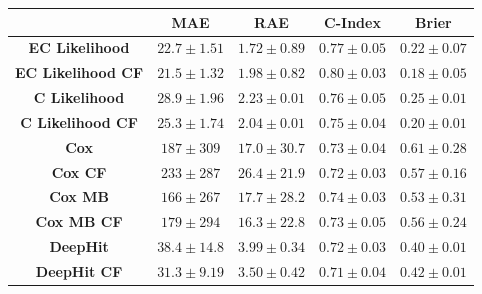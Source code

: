 \documentclass[landscape, color=UCLburgundy, margin=1cm]{uclposter}
\begin{document}
\begin{multicols}{2}
\begin{multicols}{2}
\begin{table}[H]
                \resizebox*{1.0\linewidth}{!}
                {
                    \begin{tabular}{||c|cc|c|c||}
                        \hline
                                                    & \textbf{\gls{MAE}}    & \textbf{\gls{RAE}}    & \textbf{C-Index}  & \textbf{Brier}    \\
                        \hline
                        \textbf{EC Likelihood}      & $22.7\pm1.51$         & $1.72\pm0.89$         & $0.77\pm0.05$     & $0.22\pm0.07$     \\
                        \textbf{EC Likelihood CF}   & $21.5\pm1.32$         & $1.98\pm0.82$         & $0.80\pm0.03$     & $0.18\pm0.05$     \\
                        \textbf{C Likelihood}       & $28.9\pm1.96$         & $2.23\pm0.01$         & $0.76\pm0.05$     & $0.25\pm0.01$     \\
                        \textbf{C Likelihood CF}    & $25.3\pm1.74$         & $2.04\pm0.01$         & $0.75\pm0.04$     & $0.20\pm0.01$     \\
                        \hline
                        \textbf{Cox}                & $187 \pm309 $         & $17.0\pm30.7$         & $0.73\pm0.04$     & $0.61\pm0.28$     \\
                        \textbf{Cox CF}             & $233 \pm287 $         & $26.4\pm21.9$         & $0.72\pm0.03$     & $0.57\pm0.16$     \\
                        \textbf{Cox \gls{MB}}       & $166 \pm267 $         & $17.7\pm28.2$         & $0.74\pm0.03$     & $0.53\pm0.31$     \\
                        \textbf{Cox \gls{MB} CF}    & $179 \pm294 $         & $16.3\pm22.8$         & $0.73\pm0.05$     & $0.56\pm0.24$     \\
                        \hline
                        \textbf{DeepHit}            & $38.4\pm14.8$         & $3.99\pm0.34$         & $0.72\pm0.03$     & $0.40\pm0.01$     \\
                        \textbf{DeepHit CF}         & $31.3\pm9.19$         & $3.50\pm0.42$         & $0.71\pm0.04$     & $0.42\pm0.01$     \\
                        \hline
                    \end{tabular}
                }
            \end{table}

            \AtNextBibliography{\small}
            \printbibliography
                    

\end{multicols}
\end{multicols}
\end{document}
